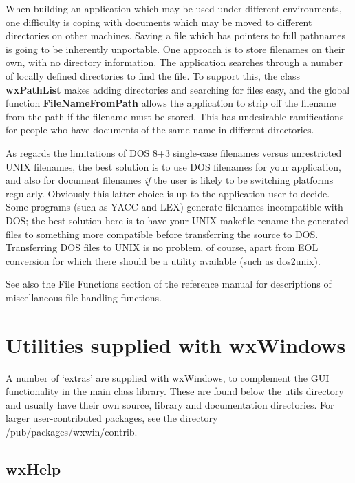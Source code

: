 When building an application which may be used under different
environments, one difficulty is coping with documents which may be
moved to different directories on other machines. Saving a file which
has pointers to full pathnames is going to be inherently unportable. One
approach is to store filenames on their own, with no directory
information.  The application searches through a number of locally
defined directories to find the file. To support this, the class {\bf
wxPathList} makes adding directories and searching for files easy, and
the global function {\bf FileNameFromPath} allows the application to
strip off the filename from the path if the filename must be stored.
This has undesirable ramifications for people who have documents of the
same name in different directories.

As regards the limitations of DOS 8+3 single-case filenames versus
unrestricted UNIX filenames, the best solution is to use DOS filenames
for your application, and also for document filenames {\it if} the user
is likely to be switching platforms regularly. Obviously this latter
choice is up to the application user to decide.  Some programs (such as
YACC and LEX) generate filenames incompatible with DOS; the best
solution here is to have your UNIX makefile rename the generated files
to something more compatible before transferring the source to DOS.
Transferring DOS files to UNIX is no problem, of course, apart from EOL
conversion for which there should be a utility available (such as
dos2unix).

See also the File Functions section of the reference manual for
descriptions of miscellaneous file handling functions.

\chapter{Utilities supplied with wxWindows}\label{utilities}
%
\setfooter{\thepage}{}{}{}{}{\thepage}%

A number of `extras' are supplied with wxWindows, to complement
the GUI functionality in the main class library. These are found
below the utils directory and usually have their own source, library
and documentation directories. For larger user-contributed packages,
see the directory /pub/packages/wxwin/contrib.

\section{wxHelp}\label{wxhelp}

